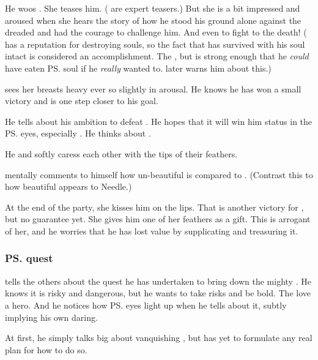 He woos \Firaxel. 
She teases him. 
(\Resviel{} are expert teasers.)
But she is a bit impressed and aroused when she hears the story of how he stood his ground alone against the dreaded \Ishnaruchaefir{} and had the courage to challenge him. 
And even to fight to the death! 
(\Ishnaruchaefir{} has a reputation for destroying souls, so the fact that \Teshrial{} has survived with his soul intact is considered an accomplishment.
The , but \Ishnaruchaefir{} is strong enough that he \emph{could} have eaten \ps{\Teshrial} soul if he \emph{really} wanted to.
\Menessiaraid{} later warns him about this.)

\Teshrial{} sees her breasts heavy ever so slightly in arousal. 
He knows he has won a small victory and is one step closer to his goal. 

He tells about his ambition to defeat . 
He hopes that it will win him status in the \ps{\resviel}{} eyes, especially \Firaxel. 
He thinks about . 


He and \Firaxel{} softly caress each other with the tips of their feathers. 

\Teshrial{} mentally comments to himself how un-beautiful \Achsah{} is compared to \Firaxel. 
(Contrast this to how beautiful \Achsah{} appears to Needle.) 

At the end of the party, she kisses him on the lips. 
That is another victory for \Teshrial, but no guarantee yet. 
She gives him one of her feathers as a gift. 
This is arrogant of her, and he worries that he has lost value by supplicating and treasuring it. 





\subsubsection{\ps{\Teshrial} quest}
\Teshrial{} tells the others about the quest he has undertaken to bring down the mighty \Ishnaruchaefir. 
He knows it is risky and dangerous, but he wants to take risks and be bold. 
The \resviel{} love a hero. 
And he notices how \ps{\Firaxel} eyes light up when he tells about it, subtly implying his own daring. 

At first, he simply talks big about vanquishing \Ishnaruchaefir, but has yet to formulate any real plan for how to do so. 

